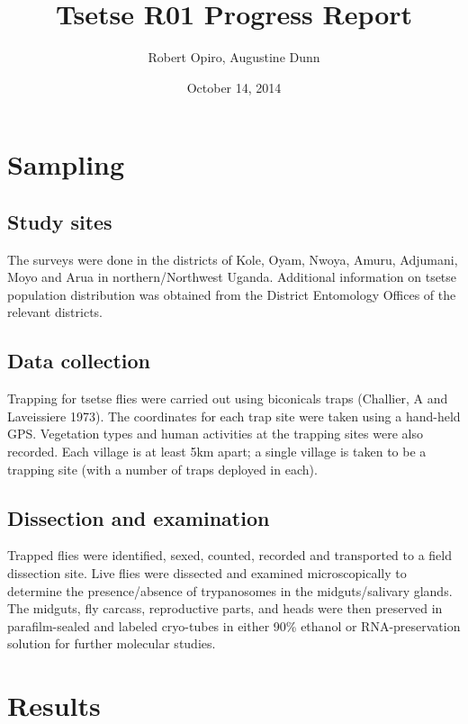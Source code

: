 \documentclass[letterpaper]{report}
\title{Tsetse R01 Progress Report\\\vspace{0.5em}{\large Sampling and Databasing}}
\author{Robert Opiro, Augustine Dunn}
\date{October 14, 2014}
\begin{document}
\maketitle

{
\hypersetup{linkcolor=black}
\setcounter{tocdepth}{3}
\tableofcontents
}
\section{Sampling}\label{Sampling}

\subsection{Study sites}\label{study-sites}

The surveys were done in the districts of Kole, Oyam, Nwoya, Amuru,
Adjumani, Moyo and Arua in northern/Northwest Uganda. Additional
information on tsetse population distribution was obtained from the
District Entomology Offices of the relevant districts.

\subsection{Data collection}\label{data-collection}

Trapping for tsetse flies were carried out using biconicals traps
({Challier, A and Laveissiere} 1973). The coordinates for each trap site
were taken using a hand-held GPS. Vegetation types and human activities
at the trapping sites were also recorded. Each village is at least 5km
apart; a single village is taken to be a trapping site (with a number of
traps deployed in each).

\subsection{Dissection and
examination}\label{dissection-and-examination}

Trapped flies were identified, sexed, counted, recorded and transported
to a field dissection site. Live flies were dissected and examined
microscopically to determine the presence/absence of trypanosomes in the
midguts/salivary glands. The midguts, fly carcass, reproductive parts,
and heads were then preserved in parafilm-sealed and labeled cryo-tubes
in either 90\% ethanol or RNA-preservation solution for further
molecular studies.

\section{Results}\label{results}
\end{document}
